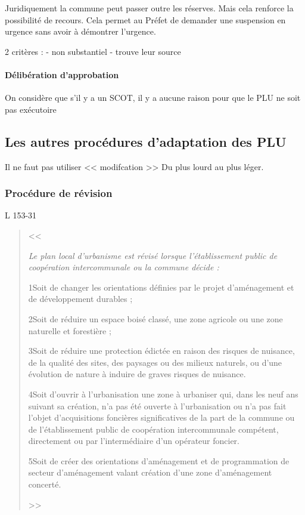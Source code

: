 		Juridiquement la commune peut passer outre les réserves. Mais cela renforce la possibilité de recours. Cela permet au Préfet de demander une suspension en urgence sans avoir à démontrer l'urgence.
		
		2 critères :
			- non substantiel
			- trouve leur source
			
		\paragraph{Délibération d'approbation}
		
		On considère que s'il y a un SCOT, il y a aucune raison pour que le PLU ne soit pas exécutoire
		
	
	\subsection{Les autres procédures d'adaptation des PLU}
	
		Il ne faut pas utiliser << modifcation >>
		 Du plus lourd au plus léger.
		 
		 \subsubsection{Procédure de révision} L 153-31
		 
		 \begin{quote}
		 	<< { \itshape
		 		Le plan local d'urbanisme est révisé lorsque l'établissement public de coopération intercommunale ou la commune décide :
		 		
		 		1\degres Soit de changer les orientations définies par le projet d'aménagement et de développement durables ;
		 		
		 		2\degres Soit de réduire un espace boisé classé, une zone agricole ou une zone naturelle et forestière ;
		 		
		 		3\degres Soit de réduire une protection édictée en raison des risques de nuisance, de la qualité des sites, des paysages ou des milieux naturels, ou d'une évolution de nature à induire de graves risques de nuisance.
		 		
		 		4\degres Soit d'ouvrir à l'urbanisation une zone à urbaniser qui, dans les neuf ans suivant sa création, n'a pas été ouverte à l'urbanisation ou n'a pas fait l'objet d'acquisitions foncières significatives de la part de la commune ou de l'établissement public de coopération intercommunale compétent, directement ou par l'intermédiaire d'un opérateur foncier.
		 		
		 		5\degres Soit de créer des orientations d'aménagement et de programmation de secteur d'aménagement valant création d'une zone d'aménagement concerté.
		 	} >>
		 \end{quote}
	 
